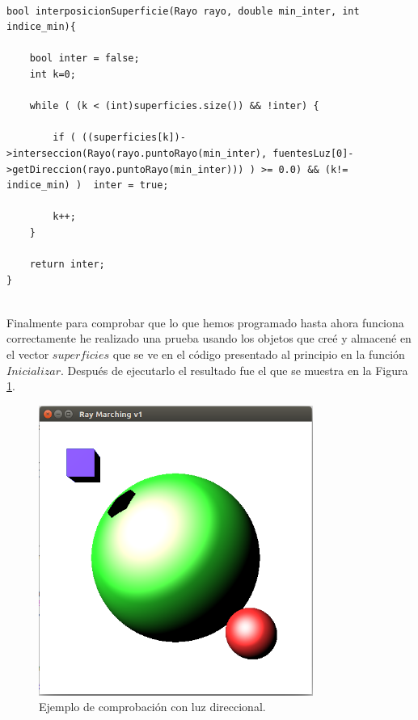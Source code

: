 \begin{lstlisting}[style=Consola]

bool interposicionSuperficie(Rayo rayo, double min_inter, int indice_min){

	bool inter = false;
	int k=0;
	
	while ( (k < (int)superficies.size()) && !inter) {

		if ( ((superficies[k])->interseccion(Rayo(rayo.puntoRayo(min_inter), fuentesLuz[0]->getDireccion(rayo.puntoRayo(min_inter))) ) >= 0.0) && (k!= indice_min) )  inter = true;
	
		k++;
	}
	
	return inter;
}
\end{lstlisting}
	${ }$\\
	
Finalmente para comprobar que lo que hemos programado hasta ahora funciona correctamente he realizado una prueba usando los objetos que creé y almacené en el vector $superficies$ que se ve en el código presentado al principio en la función $Inicializar$. Después de ejecutarlo el resultado fue el que se muestra en la Figura \ref{fig:etiq_9}.
${ }$\\

\begin{figure}[h]
	\begin{center}
		\includegraphics[width=0.8\textwidth]{imagenes/prueba.png}
	\end{center}
	\caption{Ejemplo de comprobación con luz direccional.}
	\label{fig:etiq_9}
\end{figure}
	
